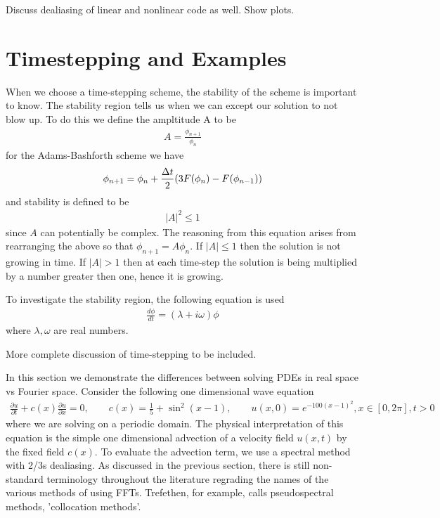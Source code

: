 Discuss dealiasing of linear and nonlinear code as well. Show plots. 
\section{Timestepping and Examples}
When we choose a time-stepping scheme, the stability of the scheme is important to know. The stability region tells us when we can except our solution to not blow up. To do this we define the ampltitude A to be
\begin{align}
A = \frac{\phi_{n+1}}{\phi_{n}}
\end{align}
for the Adams-Bashforth scheme we have 
\begin{align}
\phi_{n+1} = \phi_{n} + \frac{\Delta t}{2}(3F(\phi_{n}) - F(\phi_{n-1}))
\end{align}
and stability is defined to be 
\begin{align}
|A|^{2} \le 1
\end{align}
since $A$ can potentially be complex. The reasoning from this equation arises from rearranging the above so that $\phi_{n+1}=A\phi_{n}$. If $|A|\le 1$ then the solution is not growing in time. If $|A|>1$ then at each time-step the solution is being multiplied by a number greater then one, hence it is growing. 

To investigate the stability region, the following equation is used\cite{durran}
\begin{align}
\frac{d\phi}{dt} =  (\lambda + i\omega)\phi
\end{align}
where $\lambda,\omega$ are real numbers.  

More complete discussion of time-stepping to be included. 

In this section we demonstrate the differences between solving PDEs in real space vs Fourier space. Consider the following one dimensional wave equation\cite{trefethen_spectral}
\begin{align}
\frac{\partial u}{\partial t} + c(x)\frac{\partial u}{\partial x} = 0,\qquad c(x)=\frac{1}{5}+\sin^{2}(x-1), \qquad u(x,0)=e^{-100(x-1)^{2}}, x\in[0,2\pi], t>0
\end{align}
where we are solving on a periodic domain. The physical interpretation of this equation is the simple one dimensional advection of a velocity field $u(x,t)$ by the fixed field $c(x)$. To evaluate the advection term, we use a spectral method with 2/3s dealiasing. As discussed in the previous section, there is still non-standard terminology throughout the literature regrading the names of the various methods of using FFTs. Trefethen, for example, calls pseudospectral methods, 'collocation methods'. 

